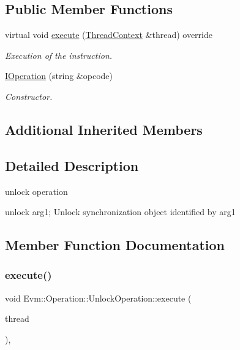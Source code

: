 \subsection*{Public Member Functions}
\begin{DoxyCompactItemize}
\item 
virtual void \mbox{\hyperlink{struct_evm_1_1_operation_1_1_unlock_operation_a012bb6185feb5186c5fe8c386068401a}{execute}} (\mbox{\hyperlink{struct_evm_1_1_thread_context}{Thread\+Context}} \&thread) override
\begin{DoxyCompactList}\small\item\em Execution of the instruction. \end{DoxyCompactList}\item 
\mbox{\hyperlink{struct_evm_1_1_operation_1_1_unlock_operation_a65e98ee1b1679e12c1d1dd000ebfe937}{I\+Operation}} (string \&opcode)
\begin{DoxyCompactList}\small\item\em Constructor. \end{DoxyCompactList}\end{DoxyCompactItemize}
\subsection*{Additional Inherited Members}


\subsection{Detailed Description}
unlock operation 

unlock arg1; Unlock synchronization object identified by arg1 

\subsection{Member Function Documentation}
\mbox{\label{struct_evm_1_1_operation_1_1_unlock_operation_a012bb6185feb5186c5fe8c386068401a}} 
\subsubsection{\texorpdfstring{execute()}{execute()}}
{\footnotesize\ttfamily void Evm\+::\+Operation\+::\+Unlock\+Operation\+::execute (\begin{DoxyParamCaption}\item[{\mbox{\hyperlink{struct_evm_1_1_thread_context}{Thread\+Context}} \&}]{thread }\end{DoxyParamCaption})\hspace{0.3cm}{\ttfamily [override]}, {\ttfamily [virtual]}}



